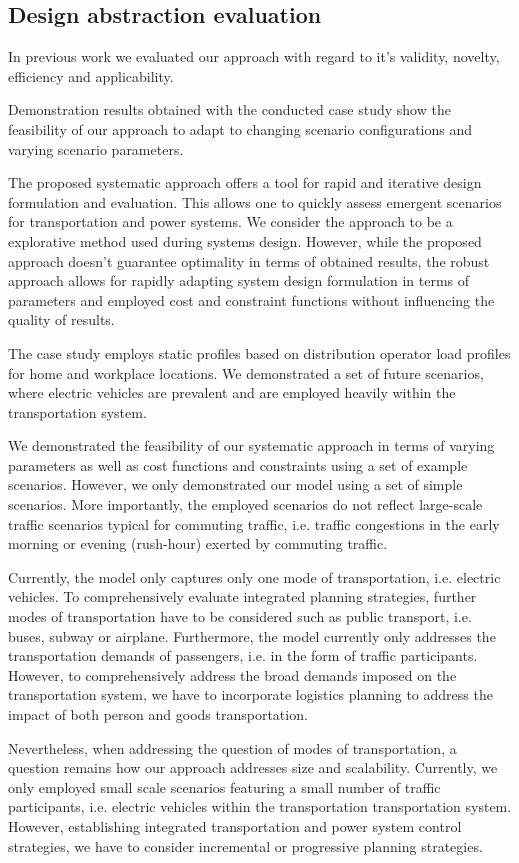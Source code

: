 \subsection{Design abstraction evaluation}
\label{discussion}
In previous work \cite{ascher2015integrated} we evaluated our approach with regard to it's validity, novelty, efficiency and applicability. 

Demonstration results obtained with the conducted case study show the feasibility of our approach to adapt to changing scenario configurations and varying scenario parameters.

The proposed systematic approach offers a tool for rapid and iterative design formulation and evaluation. This allows one to quickly assess emergent scenarios for transportation and power systems. We consider the approach to be a explorative method used during systems design. However, while the proposed approach doesn't guarantee optimality in terms of obtained results, the robust approach allows for rapidly adapting system design formulation in terms of parameters and employed cost and constraint functions without influencing the quality of results. 

The case study employs static profiles based on distribution operator load profiles for home and workplace locations. We demonstrated a set of future scenarios, where electric vehicles are prevalent and are employed heavily within the transportation system. 


We demonstrated the feasibility of our systematic approach in terms of varying parameters as well as cost functions and constraints using a set of example scenarios.
However, we only demonstrated our model using a set of simple scenarios. More importantly, the employed scenarios do not reflect large-scale traffic scenarios typical for commuting traffic, i.e. traffic congestions in the early morning or evening (rush-hour) exerted by commuting traffic.

Currently, the model only captures only one mode of transportation, i.e. electric vehicles. To comprehensively evaluate integrated planning strategies, further modes of transportation have to be considered such as public transport, i.e. buses, subway or airplane. Furthermore, the model currently only addresses the transportation demands of passengers, i.e. in the form of traffic participants. However, to comprehensively address the broad demands imposed on the transportation system, we have to incorporate logistics planning to address the impact of both person and goods transportation. 

Nevertheless, when addressing the question of modes of transportation, a question remains how our approach addresses size and scalability. Currently, we only employed small scale scenarios featuring a small number of traffic participants, i.e. electric vehicles within the transportation transportation system. However, establishing integrated transportation and power system control strategies, we have to consider incremental or progressive planning strategies.
